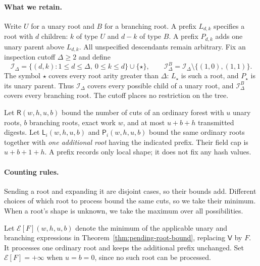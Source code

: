 \documentclass[10pt]{article}
\begin{document}
\paragraph{What we retain.} Write $U$ for a unary root and $B$ for a branching root. A prefix $L_{d,k}$ specifies a root with $d$ children: $k$ of type $U$ and $d-k$ of type $B$. A prefix $P_{d,k}$ adds one unary parent above $L_{d,k}$. All unspecified descendants remain arbitrary. Fix an inspection cutoff $\Delta\ge2$ and define
\[
 \mathcal I_\Delta=\{(d,k):1\le d\le\Delta,\ 0\le k\le d\}\cup\{\star\},\qquad \mathcal I_\Delta^{B}=\mathcal I_\Delta\setminus\{(1,0),(1,1)\}.
\]
The symbol $\star$ covers every root arity greater than $\Delta$: $L_\star$ is such a root, and $P_\star$ is its unary parent. Thus $\mathcal I_\Delta$ covers every possible child of a unary root, and $\mathcal I_\Delta^B$ covers every branching root. The cutoff places no restriction on the tree.

Let $\mathsf R(w,h,u,b)$ bound the number of cuts of an ordinary forest with $u$ unary roots, $b$ branching roots, exact work $w$, and at most $u+b+h$ transmitted digests. Let $\mathsf L_i(w,h,u,b)$ and $\mathsf P_i(w,h,u,b)$ bound the same ordinary roots together with \emph{one additional root} having the indicated prefix. Their field cap is $u+b+1+h$. A prefix records only local shape; it does not fix any hash values.

\paragraph{Counting rules.} Sending a root and expanding it are disjoint cases, so their bounds add. Different choices of which root to process bound the same cuts, so we take their minimum. When a root's shape is unknown, we take the maximum over all possibilities.

Let $\mathcal E[F](w,h,u,b)$ denote the minimum of the applicable unary and branching expressions in Theorem~\ref{thm:pending-root-bound}, replacing $\mathsf V$ by $F$. It processes one ordinary root and keeps the additional prefix unchanged. Set $\mathcal E[F]=+\infty$ when $u=b=0$, since no such root can be processed.
\end{document}
